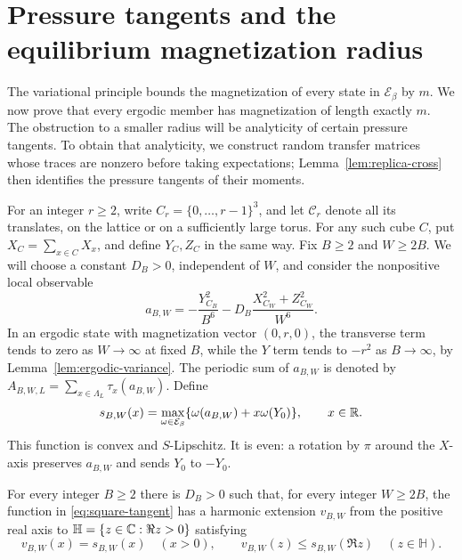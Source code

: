 \section{Pressure tangents and the equilibrium magnetization radius}
\label{sec:pressure}

The variational principle bounds the magnetization of every state in
$\mathcal E_\beta$ by $m$.  We now prove that every ergodic member has
magnetization of length exactly $m$.  The obstruction to a smaller radius
will be analyticity of certain pressure tangents.  To obtain that
analyticity, we construct random transfer matrices whose traces are
nonzero before taking expectations; Lemma~\ref{lem:replica-cross} then
identifies the pressure tangents of their moments.

For an integer $r\ge2$, write $C_r=\{0,\ldots,r-1\}^3$, and let
$\mathcal C_r$ denote all its translates, on the lattice or on a sufficiently
large torus.  For any such cube $C$, put
$X_C=\sum_{x\in C}X_x$, and define $Y_C,Z_C$ in the same way.  Fix
$B\ge2$ and $W\ge2B$.  We will choose a constant $D_B>0$, independent of
$W$, and consider the nonpositive local observable
\begin{equation}
 a_{B,W}=-\frac{Y_{C_B}^2}{B^6}
         -D_B\frac{X_{C_W}^2+Z_{C_W}^2}{W^6}.
 \label{eq:negative-square-local}
\end{equation}
In an ergodic state with magnetization vector $(0,r,0)$, the transverse
term tends to zero as $W\to\infty$ at fixed $B$, while the $Y$ term
tends to $-r^2$ as $B\to\infty$, by
Lemma~\ref{lem:ergodic-variance}.
The periodic sum of $a_{B,W}$ is denoted by
$A_{B,W,L}=\sum_{x\in\Lambda_L}\tau_x(a_{B,W})$.  Define
\begin{equation}
 s_{B,W}(x)=\max_{\omega\in\mathcal E_\beta}
       \{\omega(a_{B,W})+x\omega(Y_0)\},\qquad x\in\mathbb R.
 \label{eq:square-tangent}
\end{equation}
This function is convex and $S$-Lipschitz.  It is even: a rotation by
$\pi$ around the $X$-axis preserves $a_{B,W}$ and sends $Y_0$ to $-Y_0$.

\begin{proposition}
\label{prop:harmonic-tangent}
For every integer $B\ge2$ there is $D_B>0$ such that, for every integer
$W\ge2B$, the function in \eqref{eq:square-tangent} has a harmonic
extension $v_{B,W}$ from the positive real axis to
$\mathbb H=\{z\in\mathbb C:\Re z>0\}$ satisfying
\begin{equation}
 v_{B,W}(x)=s_{B,W}(x)\quad(x>0),\qquad
 v_{B,W}(z)\le s_{B,W}(\Re z)\quad(z\in\mathbb H).
 \label{eq:harmonic-tangent}
\end{equation}
\end{proposition}


